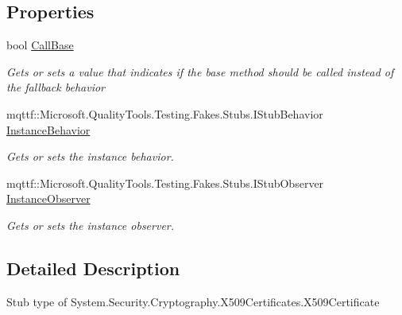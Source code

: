 \subsection*{Properties}
\begin{DoxyCompactItemize}
\item 
bool \hyperlink{class_system_1_1_security_1_1_cryptography_1_1_x509_certificates_1_1_fakes_1_1_stub_x509_certificate_a77f985c85d14e7029f916b784b303909}{Call\-Base}
\begin{DoxyCompactList}\small\item\em Gets or sets a value that indicates if the base method should be called instead of the fallback behavior\end{DoxyCompactList}\item 
mqttf\-::\-Microsoft.\-Quality\-Tools.\-Testing.\-Fakes.\-Stubs.\-I\-Stub\-Behavior \hyperlink{class_system_1_1_security_1_1_cryptography_1_1_x509_certificates_1_1_fakes_1_1_stub_x509_certificate_afe75f2759ace3438dc5f51c638f2e8f2}{Instance\-Behavior}
\begin{DoxyCompactList}\small\item\em Gets or sets the instance behavior.\end{DoxyCompactList}\item 
mqttf\-::\-Microsoft.\-Quality\-Tools.\-Testing.\-Fakes.\-Stubs.\-I\-Stub\-Observer \hyperlink{class_system_1_1_security_1_1_cryptography_1_1_x509_certificates_1_1_fakes_1_1_stub_x509_certificate_aa1905a254276511786175fef747486d3}{Instance\-Observer}
\begin{DoxyCompactList}\small\item\em Gets or sets the instance observer.\end{DoxyCompactList}\end{DoxyCompactItemize}


\subsection{Detailed Description}
Stub type of System.\-Security.\-Cryptography.\-X509\-Certificates.\-X509\-Certificate



